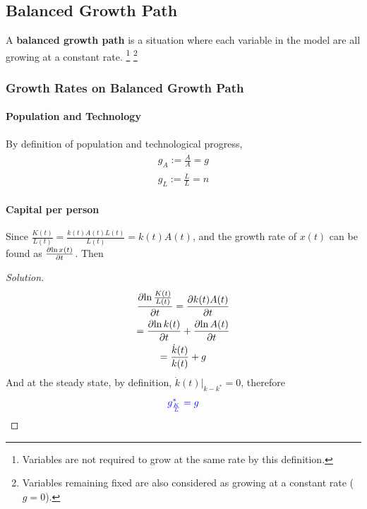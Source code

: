 \documentclass[]{article}
\begin{document}
		\subsection{Balanced Growth Path}
			\begin{definition}
				A \textbf{balanced growth path} is a situation where each variable in the model are all growing at a constant rate. \footnote{Variables are not required to grow at the same rate by this definition.} \footnote{Variables remaining fixed are also considered as growing at a constant rate ($g=0$).}
			\end{definition}
			
			\subsubsection{Growth Rates on Balanced Growth Path}
			\paragraph{Population and Technology} By definition of population and technological progress,
			\begin{gather}
				g_A := \frac{\dot{A}}{A} = g \\
				g_L := \frac{\dot{L}}{L} = n
			\end{gather}
			
			\paragraph{Capital per person} Since $\frac{K(t)}{L(t)} = \frac{k(t)A(t)L(t)}{L(t)} = k(t)A(t)$, and the growth rate of $x(t)$ can be found as $\frac{\partial{\ln{x(t)}}}{\partial{t}}$. Then
			\begin{proof}[Solution]
				\begin{gather*}
					\frac{\partial{\ln{\frac{K(t)}{L(t)}}}}{\partial{t}} = \frac{\partial{k(t)A(t)}}{\partial{t}} \\
					= \frac{\partial{\ln{k(t)}}}{\partial{t}} + \frac{\partial{\ln{A(t)}}}{\partial{t}} \\
					= \frac{\dot{k}(t)}{k(t)} + g \\
				\end{gather*}
				And at the steady state, by definition, $\dot{k}(t)|_{k-k^*} = 0$, therefore 
				\begin{equation}
					\textcolor{blue}{
						g_{\frac{K}{L}}^* = g
					}
				\end{equation}
			\end{proof}
			
\end{document}
